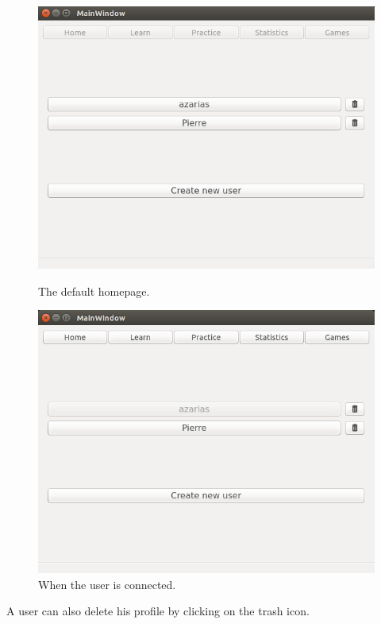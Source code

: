 \begin{figure}[H]
  \centering
  \begin{minipage}[b]{0.45\textwidth}
    \includegraphics[width=\textwidth]{images/homepage_logout.png}
    \caption{The default homepage.}
    \label{homepage-logout}
  \end{minipage}
  \hfill
  \begin{minipage}[b]{0.45\textwidth}
    \includegraphics[width=\textwidth]{images/homepage_login.png}
    \caption{When the user is connected.}
    \label{homepage-login}
  \end{minipage}
\end{figure}
A user can also delete his profile by clicking on the trash icon. \\
